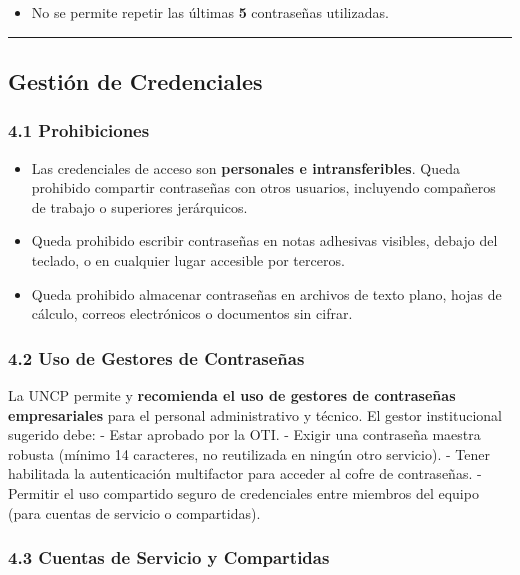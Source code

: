 \documentclass[10pt,letterpaper]{article}
\begin{document}
\begin{itemize}
\tightlist
\item
  No se permite repetir las últimas \textbf{5} contraseñas utilizadas.
\end{itemize}

\begin{center}\rule{0.5\linewidth}{0.5pt}\end{center}

\subsection{Gestión de Credenciales}\label{gestiuxf3n-de-credenciales}

\subsubsection{4.1 Prohibiciones}\label{prohibiciones}

\begin{itemize}
\tightlist
\item
  Las credenciales de acceso son \textbf{personales e intransferibles}.
  Queda prohibido compartir contraseñas con otros usuarios, incluyendo
  compañeros de trabajo o superiores jerárquicos.
\item
  Queda prohibido escribir contraseñas en notas adhesivas visibles,
  debajo del teclado, o en cualquier lugar accesible por terceros.
\item
  Queda prohibido almacenar contraseñas en archivos de texto plano,
  hojas de cálculo, correos electrónicos o documentos sin cifrar.
\end{itemize}

\subsubsection{4.2 Uso de Gestores de
Contraseñas}\label{uso-de-gestores-de-contraseuxf1as}

La UNCP permite y \textbf{recomienda el uso de gestores de contraseñas
empresariales} para el personal administrativo y técnico. El gestor
institucional sugerido debe: - Estar aprobado por la OTI. - Exigir una
contraseña maestra robusta (mínimo 14 caracteres, no reutilizada en
ningún otro servicio). - Tener habilitada la autenticación multifactor
para acceder al cofre de contraseñas. - Permitir el uso compartido
seguro de credenciales entre miembros del equipo (para cuentas de
servicio o compartidas).

\subsubsection{4.3 Cuentas de Servicio y
Compartidas}\label{cuentas-de-servicio-y-compartidas}
\end{document}
